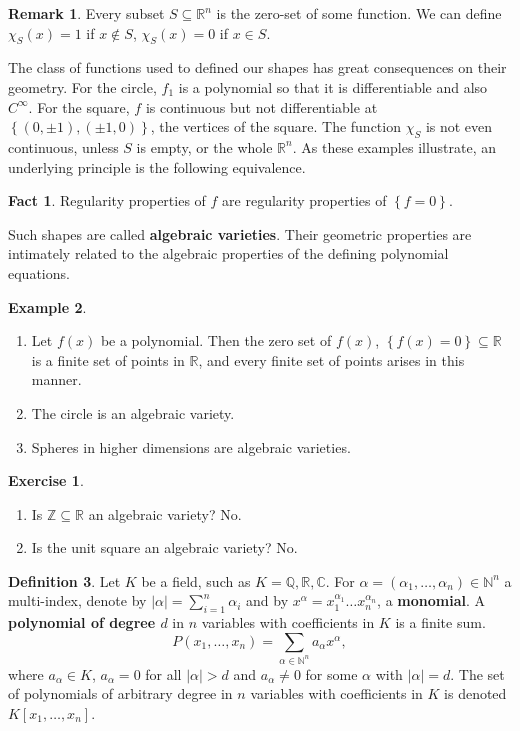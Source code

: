\documentclass{article}
\newcommand{\N}{\mathbb{N}}
\newcommand{\Z}{\mathbb{Z}}
\newcommand{\Q}{\mathbb{Q}}
\newcommand{\R}{\mathbb{R}}
\newcommand{\C}{\mathbb{C}}
\newcommand{\rb}[1]{\left( #1 \right)}
\renewcommand{\sb}[1]{\left[ #1 \right]}
\newcommand{\cb}[1]{\left\{ #1 \right\}}
\newcommand{\abs}[1]{\left\lvert #1 \right\rvert}
\theoremstyle{definition}\newtheorem{definition}{Definition}[section]
\theoremstyle{definition}\newtheorem{notation}[definition]{Notation}
\theoremstyle{definition}\newtheorem{remark}[definition]{Remark}
\theoremstyle{definition}\newtheorem{example}[definition]{Example}
\theoremstyle{definition}\newtheorem{fact}{Fact}
\theoremstyle{definition}\newtheorem{exercise}{Exercise}
\begin{document}
\begin{remark}
Every subset $ S \subseteq \R^n $ is the zero-set of some function. We can define $ \chi_S\rb{x} = 1 $ if $ x \notin S $, $ \chi_S\rb{x} = 0 $ if $ x \in S $.
\end{remark}

The class of functions used to defined our shapes has great consequences on their geometry. For the circle, $ f_1 $ is a polynomial so that it is differentiable and also $ C^\infty $. For the square, $ f $ is continuous but not differentiable at $ \cb{\rb{0, \pm 1}, \rb{\pm 1, 0}} $, the vertices of the square. The function $ \chi_S $ is not even continuous, unless $ S $ is empty, or the whole $ \R^n $. As these examples illustrate, an underlying principle is the following equivalence.

\begin{fact}
Regularity properties of $ f $ are regularity properties of $ \cb{f = 0} $.
\end{fact}

Such shapes are called \textbf{algebraic varieties}. Their geometric properties are intimately related to the algebraic properties of the defining polynomial equations.

\begin{example}
\hfill
\begin{enumerate}
\item Let $ f\rb{x} $ be a polynomial. Then the zero set of $ f\rb{x} $, $ \cb{f\rb{x} = 0} \subseteq \R $ is a finite set of points in $ \R $, and every finite set of points arises in this manner.
\item The circle is an algebraic variety.
\item Spheres in higher dimensions are algebraic varieties.
\end{enumerate}
\end{example}

\begin{exercise}
\hfill
\begin{enumerate}
\item Is $ \Z \subseteq \R $ an algebraic variety? No.
\item Is the unit square an algebraic variety? No.
\end{enumerate}
\end{exercise}

\begin{definition}
Let $ K $ be a field, such as $ K = \Q, \R, \C $. For $ \alpha = \rb{\alpha_1, \dots, \alpha_n} \in \N^n $ a multi-index, denote by $ \abs{\alpha} = \sum_{i = 1}^n \alpha_i $ and by $ x^\alpha = x_1^{\alpha_1} \dots x_n^{\alpha_n} $, a \textbf{monomial}. A \textbf{polynomial of degree $ d $} in $ n $ variables with coefficients in $ K $ is a finite sum.
$$ P\rb{x_1, \dots, x_n} = \sum_{\alpha \in \N^n} a_\alpha x^\alpha, $$
where $ a_\alpha \in K $, $ a_\alpha = 0 $ for all $ \abs{\alpha} > d $ and $ a_\alpha \ne 0 $ for some $ \alpha $ with $ \abs{\alpha} = d $. The set of polynomials of arbitrary degree in $ n $ variables with coefficients in $ K $ is denoted $ K\sb{x_1, \dots, x_n} $.
\end{definition}
\end{document}
